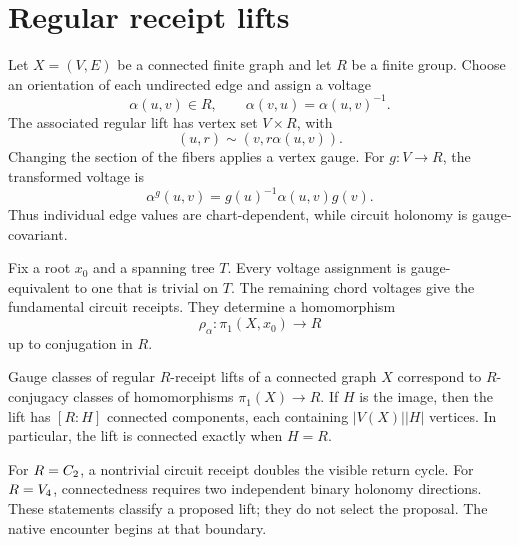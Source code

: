 \section{Regular receipt lifts}

Let \(X=(V,E)\) be a connected finite graph and let \(R\) be a finite
group.  Choose an orientation of each undirected edge and assign a
voltage
\[
  \alpha(u,v)\in R,
  \qquad
  \alpha(v,u)=\alpha(u,v)^{-1}.
\]
The associated regular lift has vertex set \(V\times R\), with
\[
  (u,r)\sim (v,r\alpha(u,v)).
\]
Changing the section of the fibers applies a vertex gauge.  For
\(g:V\to R\), the transformed voltage is
\[
  \alpha^g(u,v)
  =
  g(u)^{-1}\alpha(u,v)g(v).
\]
Thus individual edge values are chart-dependent, while circuit
holonomy is gauge-covariant.

Fix a root \(x_0\) and a spanning tree \(T\).  Every voltage assignment
is gauge-equivalent to one that is trivial on \(T\).  The remaining
chord voltages give the fundamental circuit receipts.  They determine
a homomorphism
\[
  \rho_\alpha:\pi_1(X,x_0)\longrightarrow R
\]
up to conjugation in \(R\).

\begin{theorem}
Gauge classes of regular \(R\)-receipt lifts of a connected graph
\(X\) correspond to \(R\)-conjugacy classes of homomorphisms
\(\pi_1(X)\to R\).  If \(H\) is the image, then the lift has
\([R:H]\) connected components, each containing
\(\lvert V(X)\rvert\lvert H\rvert\) vertices.  In particular, the lift
is connected exactly when \(H=R\).
\end{theorem}

For \(R=C_{2}\), a nontrivial circuit receipt doubles the visible return
cycle.  For \(R=V_{4}\), connectedness requires two independent
binary holonomy directions.  These statements classify a proposed
lift; they do not select the proposal.  The native encounter begins at
that boundary.
